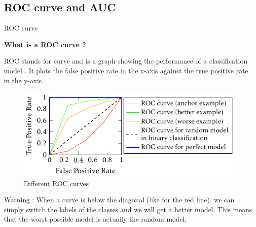 \subsection{ROC curve and AUC}
\begin{frame}{ROC curve}
    
    {\large\textbf{What is a ROC curve ?}}
    
    ROC stands for  curve and is a graph showing the performance of a classification model . It plots the false positive rate in the x-axis against the true positive rate in the y-axis. 

    \begin{figure}
        \centering
        \includegraphics[page=1, scale=0.9]{images/output-figure0.pdf}
        \vspace{-0.3cm}
        \caption{Different ROC curves}
    \end{figure}

    \vspace{-0.4cm}

    \tiny{Warning : When a curve is below the diagonal (like for the red line), we can simply switch the labels of the classes and we will get a better model. This means that the worst possible model is actually the random model.}\par
    

\end{frame}
